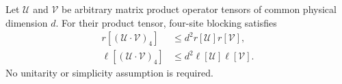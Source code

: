 \begin{lemma}
    \label{lem:mpu_four_site_composition_source_rank_bounds}
    \leanok
    Let $\mathcal U$ and $\mathcal V$ be arbitrary matrix product operator
    tensors of common physical dimension $d$. For their product tensor,
    four-site blocking satisfies
    \begin{align}
        r[(\mathcal U\mathbin{\cdot}\mathcal V)_4]
         & \leq d^2 r[\mathcal U]r[\mathcal V],       \\
        \ell[(\mathcal U\mathbin{\cdot}\mathcal V)_4]
         & \leq d^2 \ell[\mathcal U]\ell[\mathcal V].
    \end{align}
    No unitarity or simplicity assumption is required.
\end{lemma}

